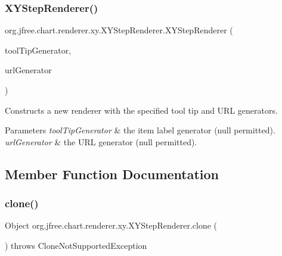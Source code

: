 \subsubsection{\texorpdfstring{X\+Y\+Step\+Renderer()}{XYStepRenderer()}\hspace{0.1cm}{\footnotesize\ttfamily [2/2]}}
{\footnotesize\ttfamily org.\+jfree.\+chart.\+renderer.\+xy.\+X\+Y\+Step\+Renderer.\+X\+Y\+Step\+Renderer (\begin{DoxyParamCaption}\item[{\mbox{\hyperlink{interfaceorg_1_1jfree_1_1chart_1_1labels_1_1_x_y_tool_tip_generator}{X\+Y\+Tool\+Tip\+Generator}}}]{tool\+Tip\+Generator,  }\item[{\mbox{\hyperlink{interfaceorg_1_1jfree_1_1chart_1_1urls_1_1_x_y_u_r_l_generator}{X\+Y\+U\+R\+L\+Generator}}}]{url\+Generator }\end{DoxyParamCaption})}

Constructs a new renderer with the specified tool tip and U\+RL generators.


\begin{DoxyParams}{Parameters}
{\em tool\+Tip\+Generator} & the item label generator ({\ttfamily null} permitted). \\
\hline
{\em url\+Generator} & the U\+RL generator ({\ttfamily null} permitted). \\
\hline
\end{DoxyParams}


\subsection{Member Function Documentation}
\mbox{\label{classorg_1_1jfree_1_1chart_1_1renderer_1_1xy_1_1_x_y_step_renderer_a88599a40cf1e5a836e84c4f9f15ef393}} 
\subsubsection{\texorpdfstring{clone()}{clone()}}
{\footnotesize\ttfamily Object org.\+jfree.\+chart.\+renderer.\+xy.\+X\+Y\+Step\+Renderer.\+clone (\begin{DoxyParamCaption}{ }\end{DoxyParamCaption}) throws Clone\+Not\+Supported\+Exception}

